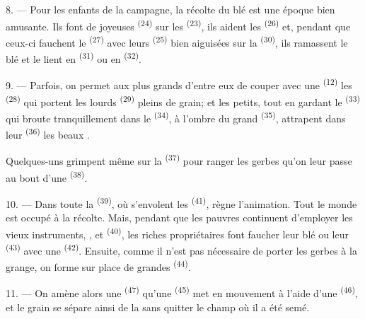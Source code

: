 8. --- Pour les enfants de la campagne, la récolte du blé est une époque bien
amusante. Ils font de joyeuses  \textsuperscript{(24)} sur les
 \textsuperscript{(23)}, ils aident les
 \textsuperscript{(26)} et, pendant que ceux-ci fauchent le
 \textsuperscript{(27)} avec leurs 
\textsuperscript{(25)} bien aiguisées sur la 
\textsuperscript{(30)}, ils ramassent le blé et le lient en 
\textsuperscript{(31)} ou en  \textsuperscript{(32)}.

9. --- Parfois, on permet aux plus grands d'entre eux de couper avec une
 \textsuperscript{(12)} les 
\textsuperscript{(28)} qui portent les lourds 
\textsuperscript{(29)} pleins de grain; et les petits, tout en gardant le
 \textsuperscript{(33)} qui broute tranquillement dans le
 \textsuperscript{(34)}, à l'ombre du grand 
\textsuperscript{(35)}, attrapent dans leur 
\textsuperscript{(36)} les beaux .

Quelques-uns grimpent même sur la  \textsuperscript{(37)}
pour ranger les gerbes qu'on leur passe au bout d'une 
\textsuperscript{(38)}.

10. --- Dans toute la  \textsuperscript{(39)}, où s'envolent les
 \textsuperscript{(41)}, règne l'animation. Tout le monde est
occupé à la récolte. Mais, pendant que les pauvres continuent d'employer les
vieux instruments, ,  et 
\textsuperscript{(40)}, les riches propriétaires font faucher leur blé ou leur
 \textsuperscript{(43)} avec une 
\textsuperscript{(42)}. Ensuite, comme il n'est pas nécessaire de porter les
gerbes à la grange, on forme sur place de grandes 
\textsuperscript{(44)}.

11. --- On amène alors une  \textsuperscript{(47)} qu'une
 \textsuperscript{(45)} met en mouvement à l'aide d'une
 \textsuperscript{(46)}, et le grain se sépare
ainsi de la  sans quitter le champ où il a été semé.

\VUsaut{5.0mm}
\VUsaut{3.4mm}

